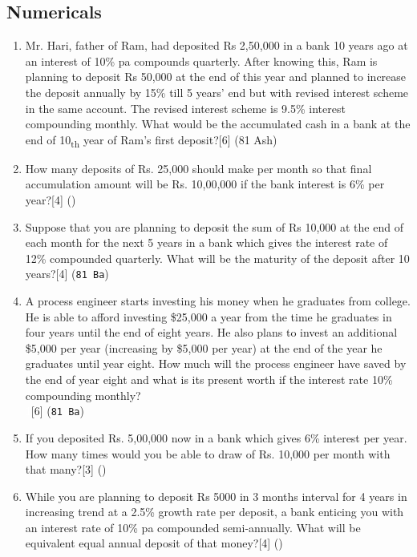 \documentclass[12pt]{article}
\newcommand{\enter}{\\\textcolor{white}{1}}
\begin{document}
\subsection{Numericals}
\begin{enumerate}
\item Mr. Hari, father of Ram, had deposited Rs 2,50,000 in a bank 10 years ago at an interest of 10\% pa compounds quarterly. After knowing this, Ram is planning to deposit Rs 50,000 at the end of this year and planned to increase the deposit annually by 15\% till 5 years' end but with revised interest scheme in the same account. The revised interest scheme is 9.5\% interest compounding monthly. What would be the accumulated cash in a bank at the end of 10\textsubscript{th} year of Ram's first deposit?\hfill[6] (81 Ash)

\item How many deposits of Rs. 25,000 should make per month so that final accumulation amount will be Rs. 10,00,000 if the bank interest is 6\% per year?\hfill[4] ()

\item Suppose that you are planning to deposit the sum of Rs 10,000 at the end of each month for the next 5 years in a bank which gives the interest rate of 12\% compounded quarterly. What will be the maturity of the deposit after 10 years?\hfill[4] (\texttt{81 Ba})

\item A process engineer starts investing his money when he graduates from college. He is able to afford investing \$25,000 a year from the time he graduates in four years until the end of eight years. He also plans to invest an additional \$5,000 per year (increasing by \$5,000 per year) at the end of the year he graduates until year eight. How much will the process engineer have saved by the end of year eight and what is its present worth if the interest rate 10\% compounding monthly?
\enter\hfill [6] (\texttt{81 Ba})

\item If you deposited Rs. 5,00,000 now in a bank which gives 6\% interest per year. How many times would you be able to draw of Rs. 10,000 per month with that many?\hfill[3] ()

\item While you are planning to deposit Rs 5000 in 3 months interval for 4 years in increasing trend at a 2.5\% growth rate per deposit, a bank enticing you with an interest rate of 10\% pa compounded semi-annually. What will be equivalent equal annual deposit of that money?\hfill[4] ()


\end{enumerate}
\end{document}
